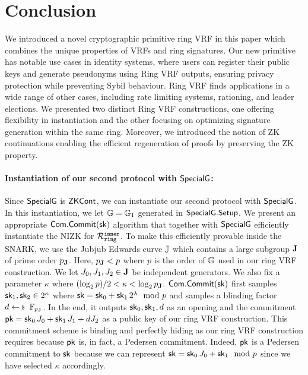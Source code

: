 \section{Conclusion}
\label{sec:conclusion}

We introduced a novel cryptographic primitive ring VRF in this paper which combines the unique properties of VRFs  and ring signatures. Our new primitive has notable use cases in identity systems, where users can register their public keys and generate pseudonyms using Ring VRF outputs, ensuring privacy protection while preventing Sybil behaviour. Ring VRF finds applications in a wide range of other cases, including rate limiting systems, rationing, and leader elections. We presented two distinct Ring VRF constructions, one offering flexibility in instantiation and the other focusing on optimizing signature generation within the same ring. Moreover, we introduced the notion of ZK continuations enabling the efficient regeneration of proofs by preserving the ZK property.

 



\paragraph{Instantiation of our second protocol with $ {\mathsf{SpecialG}} $:} Since $ {\mathsf{SpecialG}} $ is $ {\mathsf{ZKCont}} $, we can instantiate our second protocol with $ {\mathsf{SpecialG}}$. In this instantiation, we let $ {\mathbb{G}} = \mathbb{G}_1 $ generated in $ {\mathsf{SpecialG}}.{\mathsf{Setup}} $.  
We present an appropriate $ \mathsf{Com}.\mathsf{Commit}(\mathsf{sk}) $ algorithm that together with $ {\mathsf{SpecialG}} $ efficiently instantiate the NIZK for $ \mathcal{R}_{\mathtt{ring}}^{\mathtt{inner}} $. To make this efficiently provable inside the SNARK,  we use the Jubjub Edwards curve ${\mathbb{J}}$ which contains a large subgroup ${\mathbf{J}}$ of prime order $p_{\mathbf{J}}$. Here, $p_{\mathbf{J}} < p$ where $ p $ is the order of ${\mathbb{G}}$ used in our ring VRF construction. We let $J_0,J_1,J_2 \in {\mathbf{J}}$ be independent generators. We also fix a parameter $ \kappa $ where $(\log_2 p)/2 < \kappa < \log_2 p_{\mathbf{J}}$. $ \mathsf{Com}.\mathsf{Commit}(\mathsf{sk}) $ first samples $\mathsf{sk}_1,\mathsf{sk}_2 \in 2^\kappa$  where $\mathsf{sk} = \mathsf{sk}_0 + \mathsf{sk}_1 \, 2^{\lambda} \mod p$ and samples a blinding factor $d \leftsample \F_{p_\grJ} $. In the end, it outputs $ \mathsf{sk}_0, \mathsf{sk}_1,d $ as an opening and the commitment $\mathsf{pk}=\mathsf{sk}_0\, J_0 + \mathsf{sk}_1\, J_1 + d J_2$ as a public key of our ring VRF construction. This commitment scheme is binding and perfectly hiding as our ring VRF construction requires because $ \mathsf{pk} $ is, in fact, a Pedersen commitment. Indeed, $\mathsf{pk}$ is a Pedersen commitment to $\mathsf{sk}$ because we can represent $ \mathsf{sk} = \mathsf{sk}_0\, J_0 + \mathsf{sk}_1 \mod p$ since we have selected $ \kappa $ accordingly.

